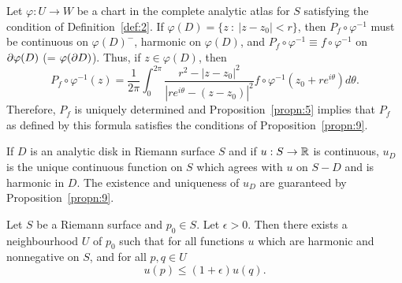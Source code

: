\documentclass[a4paper,11pt]{article}
\begin{document}
\begin{myproof}
  Let $\varphi : U \to W$ be a chart in the complete analytic atlas
  for $S$ satisfying the condition of Definition~\ref{def:2}.  If
  $\varphi(D) = \{z ~:~ |z-z_0| < r\}$, then $P_f \circ \varphi^{-1}$
  must be continuous on $\varphi(D)^-$, harmonic on $\varphi(D)$, and
  $P_f \circ \varphi^{-1} \equiv f \circ \varphi^{-1}$ on $\partial
  \varphi(D)$ (= $\varphi(\partial D)$).  Thus, if $z \in \varphi(D)$, then
  $$
  P_f \circ \varphi^{-1}(z) = \frac{1}{2\pi}\int_0^{2\pi}
  \frac{r^2-|z-z_0|^2}{|re^{i\theta} - (z-z_0)|^2}
  f\circ \varphi^{-1}(z_0 + re^{i\theta}) d\theta.
  $$
  Therefore, $P_f$ is uniquely determined and
  Proposition~\ref{propn:5} implies that $P_f$ as defined by this
  formula satisfies the conditions of Proposition~\ref{propn:9}.
\end{myproof}

\begin{defn}
  \label{def:3}
  If $D$ is an analytic disk in Riemann surface $S$ and if $u : S \to
  {\mathbb R}$ is continuous, $u_D$ is the unique continuous function on $S$
  which agrees with $u$ on $S - D$ and is harmonic in $D$.  The
  existence and uniqueness of $u_D$ are guaranteed by
  Proposition~\ref{propn:9}.
\end{defn}

\begin{lem}
  \label{lem:2}
  Let $S$ be a Riemann surface and $p_0 \in S$.  Let $\epsilon >
  0$. Then there exists a neighbourhood $U$ of $p_0$ such that for all
  functions $u$ which are harmonic and nonnegative on $S$, and for all
  $p, q \in U$
  $$
  u(p) \le (1+\epsilon) u(q).
  $$
\end{lem}
\end{document}
